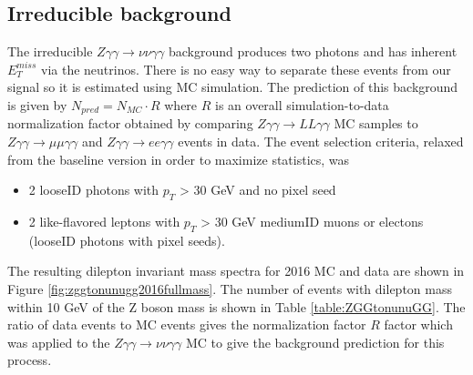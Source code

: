 \subsection{Irreducible background}
The irreducible $Z \gamma \gamma \rightarrow \nu \nu \gamma \gamma$ background produces two photons and has inherent $E^{miss}_T$ via the neutrinos.  There is no easy way to separate these events from our signal so it is estimated using MC simulation.  The prediction of this background is given by $N_{pred} = N_{MC}\cdot R$ where $R$ is an overall simulation-to-data normalization factor obtained by comparing $Z \gamma \gamma \rightarrow LL \gamma \gamma$ MC samples to $Z\gamma \gamma \rightarrow \mu \mu \gamma \gamma$ and $Z\gamma \gamma \rightarrow ee \gamma \gamma$ events in data.  The event selection criteria, relaxed from the baseline version in order to maximize statistics, was
\begin{itemize}
	\item 2 looseID photons with $p_T$ > 30 GeV and no pixel seed
	\item 2 like-flavored leptons with $p_T$ > 30 GeV %
	 mediumID muons or
	 electons (looseID photons with pixel seeds).
\end{itemize}
The resulting dilepton invariant mass spectra for 2016 MC and data are shown in Figure \ref{fig:zggtonunugg2016fullmass}.  The number of events with dilepton mass within 10 GeV of the Z boson mass is shown in Table \ref{table:ZGGtonunuGG}.  The ratio of data events to MC events gives the normalization factor $R$ factor which was applied to the $Z \gamma \gamma \rightarrow \nu \nu \gamma \gamma$ MC to give the background prediction for this process.


